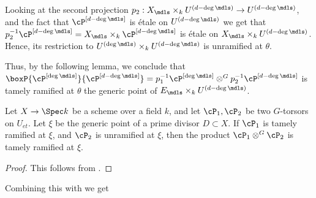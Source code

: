 Looking at the second projection $p_2:X_{\mdls} \times_k U^{(d - \deg \mdls)} \to U^{(d - \deg \mdls)}$, and the fact that 
$\cP^{[d - \deg \mdls]}$ is \'etale on $U^{(d - \deg \mdls)}$ we get that 
$p_2^{-1} \cP^{[d - \deg \mdls]}= X_{\mdls} \times_k \cP^{[d - \deg \mdls]}$ is \'etale on $X_{\mdls} \times_k U^{(d - \deg \mdls)}$.
Hence, its restriction to $U^{(\deg \mdls)} \times_k U^{(d - \deg \mdls)}$ is unramified at $\theta$.

Thus, by the following lemma, we conclude that $\boxP{\cP^{[\deg \mdls]}}{\cP^{[d - \deg \mdls]}} = p_1^{-1} \cP^{[\deg \mdls]} \otimes^G p_2^{-1} \cP^{[d - \deg \mdls]}$
     is tamely ramified at $\theta$ the generic point of $E_{\mdls} \times_k U^{(d-\deg \mdls)}$.

\begin{lemma}
     Let $X \to \Spec k$ be a scheme over a field $k$, and let $\cP_1, \cP_2$ be two $G$-torsors on $U_{et}$.
     Let $\xi$ be the generic point of a prime divisor $D \subset X$.
     If $\cP_1$ is tamely ramified at $\xi$, and $\cP_2$ is unramified at $\xi$,
     then the product $\cP_1 \otimes^G \cP_2$ is tamely ramified at $\xi$.
\end{lemma}
\begin{proof}
     This follows from .
\end{proof}

Combining this with  we get

